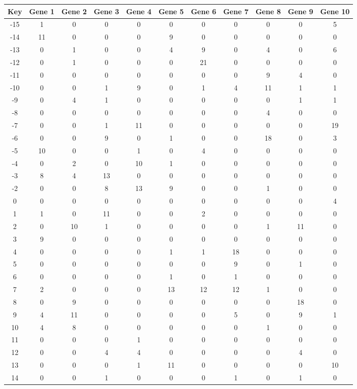 \begin{tabular}{|c|c|c|c|c|c|c|c|c|c|c|}
\hline
Key & Gene 1 & Gene 2 & Gene 3 & Gene 4 & Gene 5 & Gene 6 & Gene 7 & Gene 8 & Gene 9 & Gene 10 \\
\hline
-15 & 1 & 0 & 0 & 0 & 0 & 0 & 0 & 0 & 0 & 5 \\
-14 & 11 & 0 & 0 & 0 & 9 & 0 & 0 & 0 & 0 & 0 \\
-13 & 0 & 1 & 0 & 0 & 4 & 9 & 0 & 4 & 0 & 6 \\
-12 & 0 & 1 & 0 & 0 & 0 & 21 & 0 & 0 & 0 & 0 \\
-11 & 0 & 0 & 0 & 0 & 0 & 0 & 0 & 9 & 4 & 0 \\
-10 & 0 & 0 & 1 & 9 & 0 & 1 & 4 & 11 & 1 & 1 \\
-9 & 0 & 4 & 1 & 0 & 0 & 0 & 0 & 0 & 1 & 1 \\
-8 & 0 & 0 & 0 & 0 & 0 & 0 & 0 & 4 & 0 & 0 \\
-7 & 0 & 0 & 1 & 11 & 0 & 0 & 0 & 0 & 0 & 19 \\
-6 & 0 & 0 & 9 & 0 & 1 & 0 & 0 & 18 & 0 & 3 \\
-5 & 10 & 0 & 0 & 1 & 0 & 4 & 0 & 0 & 0 & 0 \\
-4 & 0 & 2 & 0 & 10 & 1 & 0 & 0 & 0 & 0 & 0 \\
-3 & 8 & 4 & 13 & 0 & 0 & 0 & 0 & 0 & 0 & 0 \\
-2 & 0 & 0 & 8 & 13 & 9 & 0 & 0 & 1 & 0 & 0 \\
0 & 0 & 0 & 0 & 0 & 0 & 0 & 0 & 0 & 0 & 4 \\
1 & 1 & 0 & 11 & 0 & 0 & 2 & 0 & 0 & 0 & 0 \\
2 & 0 & 10 & 1 & 0 & 0 & 0 & 0 & 1 & 11 & 0 \\
3 & 9 & 0 & 0 & 0 & 0 & 0 & 0 & 0 & 0 & 0 \\
4 & 0 & 0 & 0 & 0 & 1 & 1 & 18 & 0 & 0 & 0 \\
5 & 0 & 0 & 0 & 0 & 0 & 0 & 9 & 0 & 1 & 0 \\
6 & 0 & 0 & 0 & 0 & 1 & 0 & 1 & 0 & 0 & 0 \\
7 & 2 & 0 & 0 & 0 & 13 & 12 & 12 & 1 & 0 & 0 \\
8 & 0 & 9 & 0 & 0 & 0 & 0 & 0 & 0 & 18 & 0 \\
9 & 4 & 11 & 0 & 0 & 0 & 0 & 5 & 0 & 9 & 1 \\
10 & 4 & 8 & 0 & 0 & 0 & 0 & 0 & 1 & 0 & 0 \\
11 & 0 & 0 & 0 & 1 & 0 & 0 & 0 & 0 & 0 & 0 \\
12 & 0 & 0 & 4 & 4 & 0 & 0 & 0 & 0 & 4 & 0 \\
13 & 0 & 0 & 0 & 1 & 11 & 0 & 0 & 0 & 0 & 10 \\
14 & 0 & 0 & 1 & 0 & 0 & 0 & 1 & 0 & 1 & 0 \\
\hline
\end{tabular}